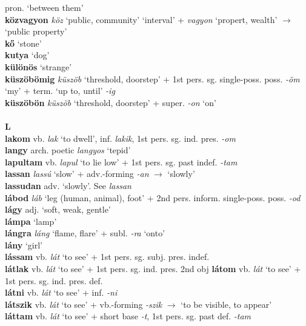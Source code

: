 \documentclass[11pt]{article}
\begin{document}
pron. `between them' \\
\textbf{közvagyon} \emph{köz} `public, community' \textbar\textbar{}
`interval' + \emph{vagyon} `propert, wealth' $\rightarrow$ `public
property' \\
\textbf{kő} `stone' \\
\textbf{kutya} `dog' \\
\textbf{különös} `strange' \\
\textbf{küszöbömig} \emph{küszöb} `threshold, doorstep' + 1st
pers. sg. single\hyp{}poss. poss. \emph{-öm} `my' + term. `up to,
until' \emph{-ig} \\
\textbf{küszöbön} \emph{küszöb} `threshold, doorstep' +
super. \emph{-on} `on' \\
\ \\
\noindent \textbf{\large L} \\
\textbf{lakom} vb. \emph{lak} `to dwell', inf. \emph{lakik}, 1st
pers. sg. ind. pres. \emph{-om} \\
\textbf{langy} arch. poetic \emph{langyos} `tepid' \\
\textbf{lapultam} vb. \emph{lapul} `to lie low' + 1st pers. sg. past
indef. \emph{-tam} \\
\textbf{lassan} \emph{lassú} `slow' + adv.\hyp{}forming \emph{-an}
$\rightarrow$ `slowly' \\
\textbf{lassudan} adv. `slowly'. See \emph{lassan} \\
\textbf{lábod} \emph{láb} `leg (human, animal), foot' + 2nd
pers. inform. single\hyp{}poss. poss. \emph{-od} \\
\textbf{lágy} adj. `soft, weak, gentle' \\
\textbf{lámpa} `lamp' \\
\textbf{lángra} \emph{láng} `flame, flare' + subl. \emph{-ra}
`onto' \\
\textbf{lány} `girl' \\
\textbf{lássam} vb. \emph{lát} `to see' + 1st
pers. sg. subj. pres. indef. \\
\textbf{látlak} vb. \emph{lát} `to see' + 1st pers. sg. ind. pres. 2nd obj
\textbf{látom} vb. \emph{lát} `to see' + 1st
pers. sg. ind. pres. def. \\
\textbf{látni} vb. \emph{lát} `to see' + inf. \emph{-ni} \\
\textbf{látszik} vb. \emph{lát} `to see' + vb.-forming \emph{-szik}
$\rightarrow$ `to be visible, to appear' \\
\textbf{láttam} vb. \emph{lát} `to see' + short base \emph{-t}, 1st
pers. sg. past def. \emph{-tam} \\
\end{document}
